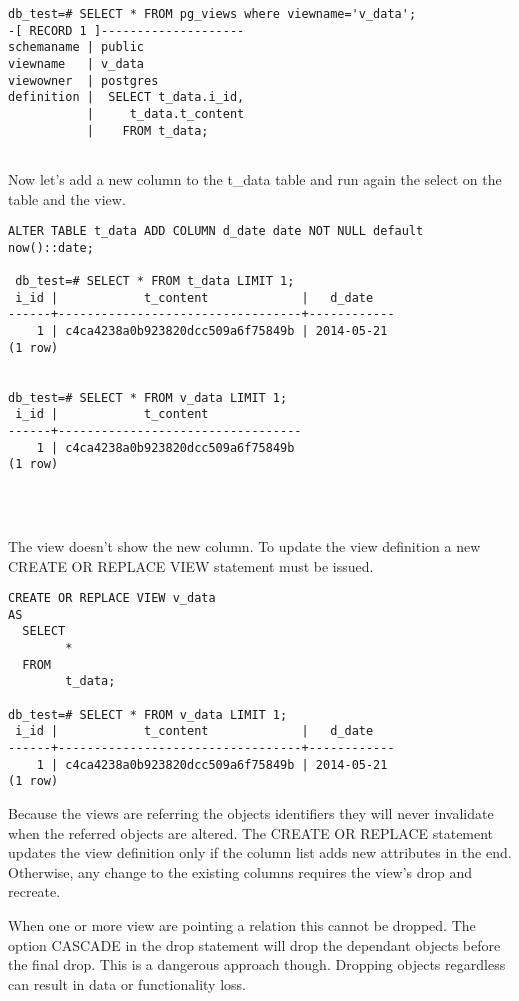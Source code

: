 \begin{lstlisting}[style=pgsql]
 db_test=# SELECT * FROM pg_views where viewname='v_data';
-[ RECORD 1 ]--------------------
schemaname | public
viewname   | v_data
viewowner  | postgres
definition |  SELECT t_data.i_id,
           |     t_data.t_content
           |    FROM t_data;


\end{lstlisting}

Now let's add a new column to the t\_data table and run again the select on the 
table and the view.

\begin{lstlisting}[style=pgsql]
 ALTER TABLE t_data ADD COLUMN d_date date NOT NULL default now()::date;
 
 db_test=# SELECT * FROM t_data LIMIT 1;
 i_id |            t_content             |   d_date   
------+----------------------------------+------------
    1 | c4ca4238a0b923820dcc509a6f75849b | 2014-05-21
(1 row)


db_test=# SELECT * FROM v_data LIMIT 1;
 i_id |            t_content             
------+----------------------------------
    1 | c4ca4238a0b923820dcc509a6f75849b
(1 row)


 
\end{lstlisting}

The view doesn't show the new column. To update the view definition a new 
CREATE OR REPLACE VIEW statement must be issued.

\begin{lstlisting}[style=pgsql]
 CREATE OR REPLACE VIEW v_data 
AS 
  SELECT 
        *
  FROM 
        t_data;
        
db_test=# SELECT * FROM v_data LIMIT 1;
 i_id |            t_content             |   d_date   
------+----------------------------------+------------
    1 | c4ca4238a0b923820dcc509a6f75849b | 2014-05-21
(1 row)

\end{lstlisting}

Because the views are referring the objects identifiers they will never 
invalidate when the referred objects are altered. 
The CREATE OR REPLACE statement updates the view definition only if the column 
list adds new attributes in the end. 
Otherwise, any change to the existing columns requires the view's drop and 
recreate. 

When one or more view are pointing a relation this cannot be dropped. 
The option CASCADE in the drop statement will drop the dependant objects before 
the final drop. This is a dangerous approach though. Dropping objects 
regardless can result in data or functionality loss.

